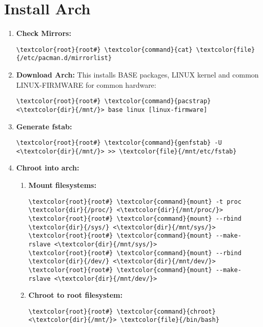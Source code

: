 \documentclass[10pt, a4paper, onecolumn, openany]{book} %
\begin{document}
\section{Install Arch}
\begin{enumerate}
    \item \textbf{Check Mirrors:}
\begin{Verbatim}[commandchars=\\\{\}]
\textcolor{root}{root#} \textcolor{command}{cat} \textcolor{file}{/etc/pacman.d/mirrorlist}
\end{Verbatim}

    \item \textbf{Download Arch:}
\newline This installs BASE packages, LINUX kernel and common LINUX-FIRMWARE for common hardware:
\begin{Verbatim}[commandchars=\\\{\}]
\textcolor{root}{root#} \textcolor{command}{pacstrap} <\textcolor{dir}{/mnt/}> base linux [linux-firmware] 
\end{Verbatim}

    \item \textbf{Generate fstab:}
\begin{Verbatim}[commandchars=\\\{\}]
\textcolor{root}{root#} \textcolor{command}{genfstab} -U <\textcolor{dir}{/mnt/}> >> \textcolor{file}{/mnt/etc/fstab}
\end{Verbatim}

    \item \textbf{Chroot into arch:}
    \begin{enumerate}
        \item \textbf{Mount filesystems:}
\begin{Verbatim}[commandchars=\\\{\}]
\textcolor{root}{root#} \textcolor{command}{mount} -t proc \textcolor{dir}{/proc/} <\textcolor{dir}{/mnt/proc/}>
\textcolor{root}{root#} \textcolor{command}{mount} --rbind \textcolor{dir}{/sys/} <\textcolor{dir}{/mnt/sys/}>
\textcolor{root}{root#} \textcolor{command}{mount} --make-rslave <\textcolor{dir}{/mnt/sys/}>
\textcolor{root}{root#} \textcolor{command}{mount} --rbind \textcolor{dir}{/dev/} <\textcolor{dir}{/mnt/dev/}>
\textcolor{root}{root#} \textcolor{command}{mount} --make-rslave <\textcolor{dir}{/mnt/dev/}>
\end{Verbatim}
        \item \textbf{Chroot to root filesystem:}
\begin{Verbatim}[commandchars=\\\{\}]
\textcolor{root}{root#} \textcolor{command}{chroot} <\textcolor{dir}{/mnt/}> \textcolor{file}{/bin/bash}
\end{Verbatim}
    \end{enumerate}


\end{enumerate}
\end{document}

